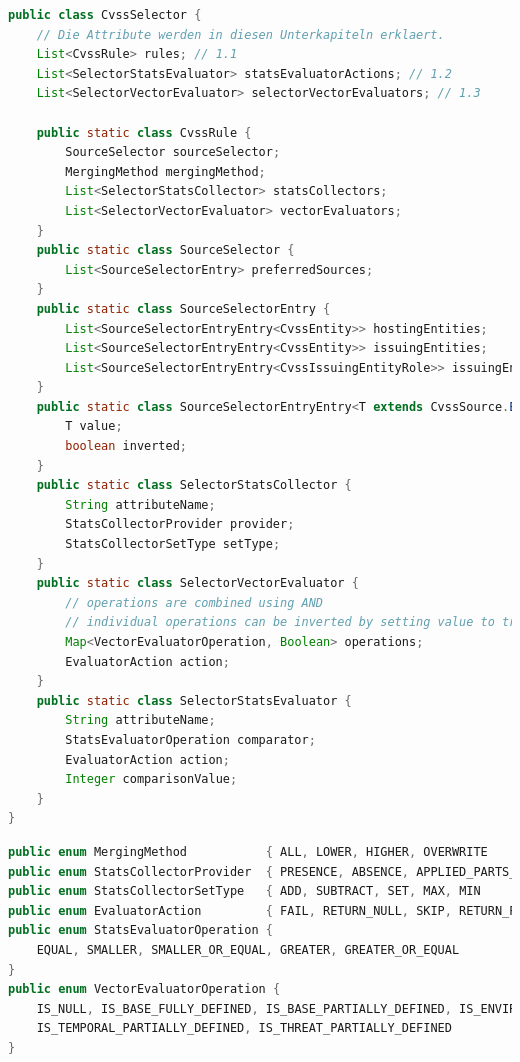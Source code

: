 \begin{lstlisting}[language=Java, label={lst:cvss-selector-class-attributes}, caption={CVSS-Selektor Klassen}, basicstyle=\scriptsize]
public class CvssSelector {
    // Die Attribute werden in diesen Unterkapiteln erklaert.
    List<CvssRule> rules; // 1.1
    List<SelectorStatsEvaluator> statsEvaluatorActions; // 1.2
    List<SelectorVectorEvaluator> selectorVectorEvaluators; // 1.3

    public static class CvssRule {
        SourceSelector sourceSelector;
        MergingMethod mergingMethod;
        List<SelectorStatsCollector> statsCollectors;
        List<SelectorVectorEvaluator> vectorEvaluators;
    }
    public static class SourceSelector {
        List<SourceSelectorEntry> preferredSources;
    }
    public static class SourceSelectorEntry {
        List<SourceSelectorEntryEntry<CvssEntity>> hostingEntities;
        List<SourceSelectorEntryEntry<CvssEntity>> issuingEntities;
        List<SourceSelectorEntryEntry<CvssIssuingEntityRole>> issuingEntityRoles;
    }
    public static class SourceSelectorEntryEntry<T extends CvssSource.EntityNameProvider> {
        T value;
        boolean inverted;
    }
    public static class SelectorStatsCollector {
        String attributeName;
        StatsCollectorProvider provider;
        StatsCollectorSetType setType;
    }
    public static class SelectorVectorEvaluator {
        // operations are combined using AND
        // individual operations can be inverted by setting value to true
        Map<VectorEvaluatorOperation, Boolean> operations;
        EvaluatorAction action;
    }
    public static class SelectorStatsEvaluator {
        String attributeName;
        StatsEvaluatorOperation comparator;
        EvaluatorAction action;
        Integer comparisonValue;
    }
}
\end{lstlisting}

\begin{lstlisting}[language=Java, label={lst:cvss-selector-enum-definitions}, caption={CVSS-Selektor Enumerations}, basicstyle=\scriptsize]
public enum MergingMethod           { ALL, LOWER, HIGHER, OVERWRITE            }
public enum StatsCollectorProvider  { PRESENCE, ABSENCE, APPLIED_PARTS_COUNT   }
public enum StatsCollectorSetType   { ADD, SUBTRACT, SET, MAX, MIN             }
public enum EvaluatorAction         { FAIL, RETURN_NULL, SKIP, RETURN_PREVIOUS }
public enum StatsEvaluatorOperation {
    EQUAL, SMALLER, SMALLER_OR_EQUAL, GREATER, GREATER_OR_EQUAL
}
public enum VectorEvaluatorOperation {
    IS_NULL, IS_BASE_FULLY_DEFINED, IS_BASE_PARTIALLY_DEFINED, IS_ENVIRONMENTAL_PARTIALLY_DEFINED,
    IS_TEMPORAL_PARTIALLY_DEFINED, IS_THREAT_PARTIALLY_DEFINED
}
\end{lstlisting}

